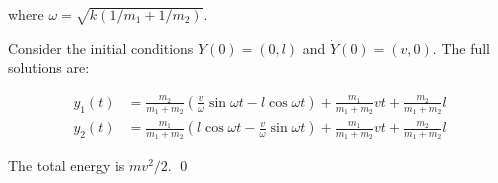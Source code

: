 \documentclass[12pt]{article}
\begin{document}
where $\omega = \sqrt{k(1/m_{1} + 1/m_{2})}$.

Consider the initial conditions $Y(0) = (0, l)$ and $\dot{Y}(0) = (v, 0)$. The full solutions are:

\begin{equation}
    \begin{split}
        y_{1}(t) &= \frac{m_{2}}{m_{1} + m_{2}} \left( \frac{v}{\omega} \sin{\omega t} - l\cos{\omega t} \right) + \frac{m_{1}}{m_{1} + m_{2}} vt + \frac{m_{2}}{m_{1} + m_{2}} l \\
        y_{2}(t) &= \frac{m_{1}}{m_{1} + m_{2}} \left( l\cos{\omega t} - \frac{v}{\omega} \sin{\omega t} \right) + \frac{m_{1}}{m_{1} + m_{2}} vt + \frac{m_{2}}{m_{1} + m_{2}} l
    \end{split}
\end{equation}

The total energy is $mv^{2}/2$.
\qed
\end{document}
